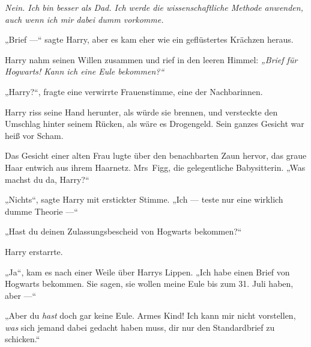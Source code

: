 \emph{Nein. Ich bin besser als Dad. Ich werde die wissenschaftliche Methode anwenden, auch wenn ich mir dabei dumm vorkomme.}

„Brief —“ sagte Harry, aber es kam eher wie ein geflüstertes Krächzen heraus.

Harry nahm seinen Willen zusammen und rief in den leeren Himmel: \emph{„Brief für Hogwarts! Kann ich eine Eule bekommen?“}

„Harry?“, fragte eine verwirrte Frauenstimme, eine der Nachbarinnen.

Harry riss seine Hand herunter, als würde sie brennen, und versteckte den Umschlag hinter seinem Rücken, als wäre es Drogengeld. Sein ganzes Gesicht war heiß vor Scham.

Das Gesicht einer alten Frau lugte über den benachbarten Zaun hervor, das graue Haar entwich aus ihrem Haarnetz. Mrs~Figg, die gelegentliche Babysitterin. „Was machst du da, Harry?“

„Nichts“, sagte Harry mit erstickter Stimme. „Ich — teste nur eine wirklich dumme Theorie —“

„Hast du deinen Zulassungsbescheid von Hogwarts bekommen?“

Harry erstarrte.

„Ja“, kam es nach einer Weile über Harrys Lippen. „Ich habe einen Brief von Hogwarts bekommen. Sie sagen, sie wollen meine Eule bis zum 31. Juli haben, aber —“

„Aber du \emph{hast} doch gar keine Eule. Armes Kind! Ich kann mir nicht vorstellen, \emph{was} sich jemand dabei gedacht haben muss, dir nur den Standardbrief zu schicken.“

